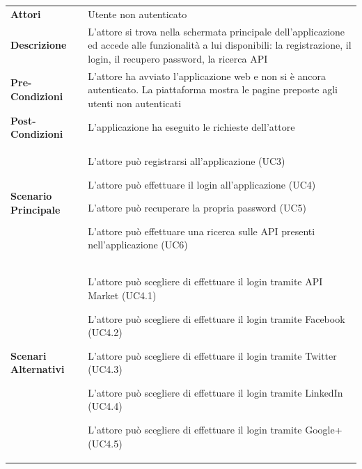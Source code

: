 \renewcommand*{\arraystretch}{1.6}
\begin{longtable}{ l | p{11cm}}
	\hline
	\rowcolor{Gray}
	\multicolumn{2}{c}{UC1 - Main pre-autenticazione} \\
	\hline
	\textbf{Attori} & Utente non autenticato  \\
	\textbf{Descrizione} & L'attore si trova nella schermata principale dell'applicazione ed accede alle funzionalità a lui disponibili: la registrazione, il login, il recupero password, la ricerca API \\
	\textbf{Pre-Condizioni} & L'attore ha avviato l'applicazione web e non si è ancora autenticato. La piattaforma mostra le pagine preposte agli utenti non autenticati \\
	\textbf{Post-Condizioni} & L'applicazione ha eseguito le richieste dell'attore \\
	\textbf{Scenario Principale} & 
	\begin{enumerate*}[label=(\arabic*.),itemjoin={\newline}]
		\item L'attore può registrarsi all'applicazione (UC3)
		\item L'attore può effettuare il login all'applicazione (UC4)
		\item L'attore può recuperare la propria password (UC5)
		\item L'attore può effettuare una ricerca sulle API presenti nell'applicazione (UC6)
	\end{enumerate*}\\
	\textbf{Scenari Alternativi} & 
	\begin{enumerate*}[label=(\arabic*.),itemjoin={\newline}]
		\item L'attore può scegliere di effettuare il login tramite API Market (UC4.1)
		\item L'attore può scegliere di effettuare il login tramite Facebook (UC4.2)
		\item L'attore può scegliere di effettuare il login tramite Twitter (UC4.3)
		\item L'attore può scegliere di effettuare il login tramite LinkedIn (UC4.4)
		\item L'attore può scegliere di effettuare il login tramite Google+ (UC4.5)
	\end{enumerate*}\\
\end{longtable}